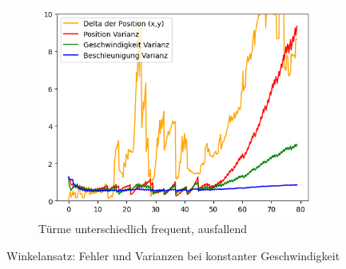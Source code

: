 \begin{figure}
\begin{subfigure}{.333\textwidth}
        \includegraphics[width=.9\linewidth]{Ergebnisse/plots_ungenauigkeiten/winkel/winkel_dyn_acc_flag_freq.png}
        \caption{Türme unterschiedlich frequent, ausfallend}
    \end{subfigure}
    \caption{Winkelansatz: Fehler und Varianzen bei konstanter Geschwindigkeit}
    \label{abb:winkel-da-fehler}
\end{figure}